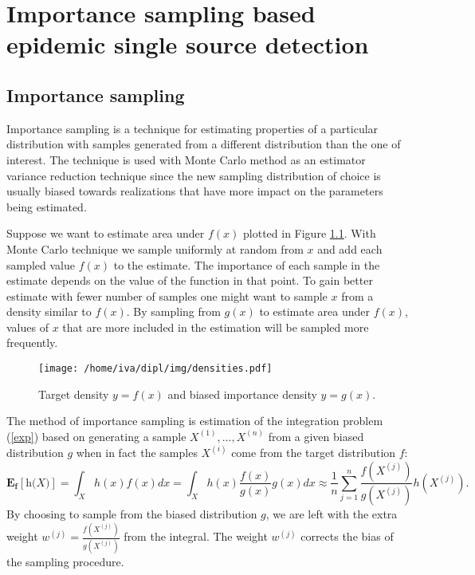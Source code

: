 \documentclass[times, utf8, diplomski]{fer}
\begin{document}
\chapter{Importance sampling based epidemic single source detection}
\label{IS}

\section{Importance sampling}

Importance sampling is a technique for estimating properties of a particular distribution with samples generated from a different distribution than the one of interest. The technique is used with Monte Carlo method as an estimator variance reduction technique since  the new sampling distribution of choice is usually biased towards realizations that have more impact on the parameters being estimated.

Suppose we want to estimate area under $f(x)$ plotted in Figure \ref{densities}. With Monte Carlo technique we sample uniformly at random from $x$ and add each sampled value $f(x)$ to the estimate. The importance of each sample in the estimate depends on the value of the function in that point. To gain better estimate with fewer number of samples one might want to sample $x$ from a density similar to $f(x)$. By sampling from $g(x)$ to estimate area under $f(x)$, values of $x$ that are more included in the estimation  will be sampled more frequently. 
\begin{figure}[h]
\center
\texttt{[image: /home/iva/dipl/img/densities.pdf]}
\caption{Target density $y = f(x)$ and biased importance density $y = g(x)$.}
\label{densities}
\end{figure}

The method of importance sampling is estimation of the integration problem (\ref{exp}) based on generating a sample $X^{(1)}, \ldots, X^{(n)}$ from a given biased distribution $\textit{g}$ when in fact the samples $X^{(i)}$ come from the target distribution $\textit{f}$:
\begin{equation}
\mathbf{E_f[\textit{h(X)}]} = \int_{X} h(x) f(x) dx = \int_{X} h(x) \frac{f(x)}{g(x)} g(x) dx \approx \frac{1}{n} \sum_{j = 1}^{n} \frac{f(X^{(j)})}{g(X^{(j)})} h(X^{(j)}).
\end{equation}
By choosing to sample from the biased distribution $g$, we are left with the extra weight $w^{(j)} = \frac{f(X^{(j)})}{g(X^{(j)})}$ from the integral. The weight $w^{(j)}$ corrects the bias of the sampling procedure. 
\end{document}
